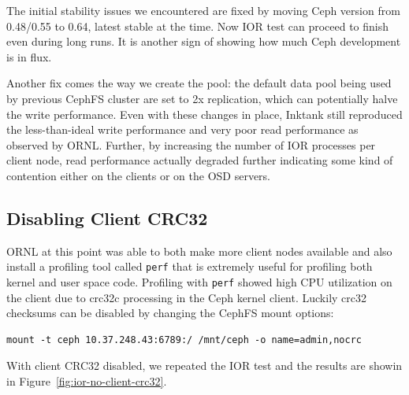 \documentclass{article}
\begin{document}
The initial stability issues we encountered are fixed by moving Ceph version
from 0.48/0.55 to 0.64, latest stable at the time. Now IOR test can proceed to
finish even during long runs. It is another sign of showing how much Ceph
development is in flux.

Another fix comes the way we create the pool: the default data pool being used
by previous CephFS cluster are set to 2x replication, which can potentially
halve the write performance. Even with these changes in place, Inktank still
reproduced the less-than-ideal write performance and very poor read
performance as observed by ORNL.  Further, by increasing the number of IOR
processes per client node, read performance actually degraded further
indicating some kind of contention either on the clients or on the OSD
servers.


\subsection{Disabling Client CRC32}

ORNL at this point was able to both make more client nodes available and also
install a profiling tool called \verb!perf! that is extremely useful for
profiling both kernel and user space code.  Profiling with \verb!perf! showed
high CPU utilization on the client due to crc32c processing in the Ceph kernel
client.  Luckily crc32 checksums can be disabled by changing the CephFS mount
options:

\begin{Verbatim}
mount -t ceph 10.37.248.43:6789:/ /mnt/ceph -o name=admin,nocrc
\end{Verbatim}


With client CRC32 disabled, we repeated the IOR test and the results are showin
in Figure~\ref{fig:ior-no-client-crc32}. 
\end{document}
